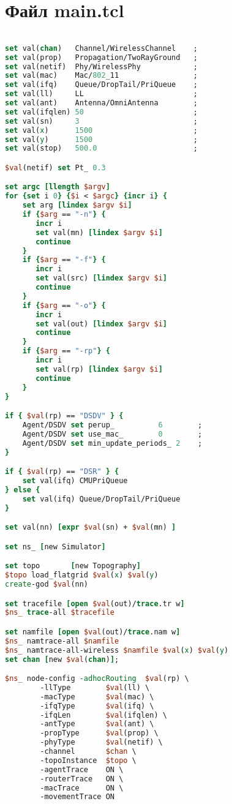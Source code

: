 \chapter{Файл main.tcl}

\hypertarget{ap_main_tcl}{}

\begin{lstlisting}[language=tcl, style=mystyle, caption=Файл main.tcl]

set val(chan)   Channel/WirelessChannel    ;
set val(prop)   Propagation/TwoRayGround   ;
set val(netif)  Phy/WirelessPhy            ;
set val(mac)    Mac/802_11                 ;
set val(ifq)    Queue/DropTail/PriQueue    ;
set val(ll)     LL                         ;
set val(ant)    Antenna/OmniAntenna        ;
set val(ifqlen) 50                         ;
set val(sn)     3                          ;
set val(x)      1500                       ;
set val(y)      1500                       ;
set val(stop)   500.0                      ;

$val(netif) set Pt_ 0.3

set argc [llength $argv]
for {set i 0} {$i < $argc} {incr i} {
    set arg [lindex $argv $i]
    if {$arg == "-n"} {
       incr i
       set val(mn) [lindex $argv $i]
       continue
    }
    if {$arg == "-f"} {
       incr i
       set val(src) [lindex $argv $i]
       continue
    }
    if {$arg == "-o"} {
       incr i
       set val(out) [lindex $argv $i]
       continue
    }
    if {$arg == "-rp"} {
       incr i
       set val(rp) [lindex $argv $i]
       continue
    }
}

if { $val(rp) == "DSDV" } {
    Agent/DSDV set perup_          6        ;
    Agent/DSDV set use_mac_        0        ;
    Agent/DSDV set min_update_periods_ 2    ;
}

if { $val(rp) == "DSR" } {
    set val(ifq) CMUPriQueue
} else {
    set val(ifq) Queue/DropTail/PriQueue
}

set val(nn) [expr $val(sn) + $val(mn) ]

set ns_ [new Simulator]

set topo       [new Topography]
$topo load_flatgrid $val(x) $val(y)
create-god $val(nn)

set tracefile [open $val(out)/trace.tr w]
$ns_ trace-all $tracefile

set namfile [open $val(out)/trace.nam w]
$ns_ namtrace-all $namfile
$ns_ namtrace-all-wireless $namfile $val(x) $val(y)
set chan [new $val(chan)];

$ns_ node-config -adhocRouting  $val(rp) \
        -llType        $val(ll) \
        -macType       $val(mac) \
        -ifqType       $val(ifq) \
        -ifqLen        $val(ifqlen) \
        -antType       $val(ant) \
        -propType      $val(prop) \
        -phyType       $val(netif) \
        -channel       $chan \
        -topoInstance  $topo \
        -agentTrace    ON \
        -routerTrace   ON \
        -macTrace      ON \
        -movementTrace ON



\end{lstlisting}

